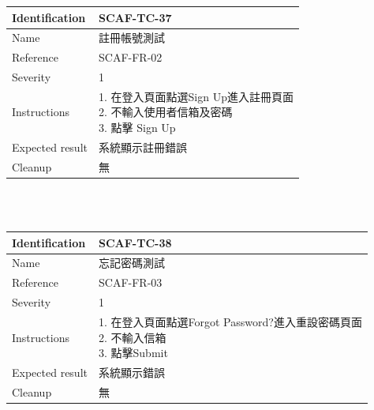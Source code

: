 \documentclass{report}
\begin{document}
\begin{tabularx}{\textwidth}{
  |p{}%
  |p{}|%
  }
  \hline
  \centering Identification &  SCAF-TC-37 \\
  \hline
  \centering Name & 註冊帳號測試 \\
  \hline
  \centering Reference & SCAF-FR-02 \\
  \hline
  \centering Severity & 1 \\
  \hline
  \centering Instructions & 
  \makecell[l]{
    1. 在登入頁面點選Sign Up進入註冊頁面 \\
    2. 不輸入使用者信箱及密碼  \\
    3. 點擊 Sign Up
  }\\
  \hline
  \centering Expected result & 系統顯示註冊錯誤 \\
  \hline
  \centering Cleanup & 無 \\
  \hline
\end{tabularx}
\\
\newline
\\
\begin{tabularx}{\textwidth}{
  |p{}%
  |p{}|%
  }
  \hline
  \centering Identification &  SCAF-TC-38 \\
  \hline
  \centering Name & 忘記密碼測試 \\
  \hline
  \centering Reference & SCAF-FR-03 \\
  \hline
  \centering Severity & 1 \\
  \hline
  \centering Instructions & 
  \makecell[l]{
    1. 在登入頁面點選Forgot Password?進入重設密碼頁面 \\
    2. 不輸入信箱  \\
    3. 點擊Submit \\
  }\\
  \hline
  \centering Expected result & 系統顯示錯誤 \\
  \hline
  \centering Cleanup & 無 \\
  \hline
\end{tabularx}
\\
\newline
\\
\end{document}

